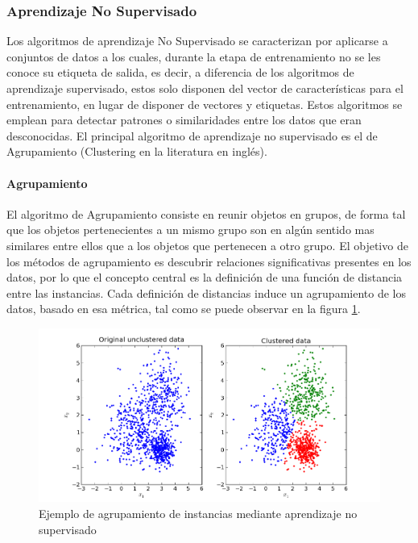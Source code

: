 \documentclass[a4paper,11pt,spanish]{book}
\begin{document}
      \subsubsection{Aprendizaje No Supervisado}
	  Los algoritmos de aprendizaje No Supervisado se caracterizan por aplicarse a conjuntos de datos a los cuales, durante la etapa de entrenamiento no se les conoce su etiqueta
	  de salida, es decir, a diferencia de los algoritmos de aprendizaje supervisado, estos solo disponen del vector de características para el entrenamiento, en lugar de disponer
	  de vectores y etiquetas. Estos algoritmos se emplean para detectar patrones o similaridades entre los datos que eran desconocidas.
	  El principal algoritmo de aprendizaje no supervisado es el de Agrupamiento (Clustering en la literatura en inglés).

	\paragraph {Agrupamiento}
	   El algoritmo de Agrupamiento consiste en reunir objetos en grupos, de forma tal que los objetos pertenecientes a un mismo grupo son en algún sentido mas similares
	   entre ellos que a los objetos que pertenecen a otro grupo. El objetivo de los métodos de agrupamiento es descubrir relaciones significativas presentes en los datos, por lo
	   que el concepto central es la definición de una función de distancia entre las instancias. Cada definición de distancias induce un agrupamiento de los datos, basado en esa 
	   métrica, tal como se puede observar en la figura \ref{fig:clustering}.
	   

	  \begin{figure}[H]
	    \includegraphics[scale=0.5]{./img/stackoverflow_clustering.png}
	    \caption{Ejemplo de agrupamiento de instancias mediante aprendizaje no supervisado}
	    \label{fig:clustering}
	  \end{figure}
\end{document}
